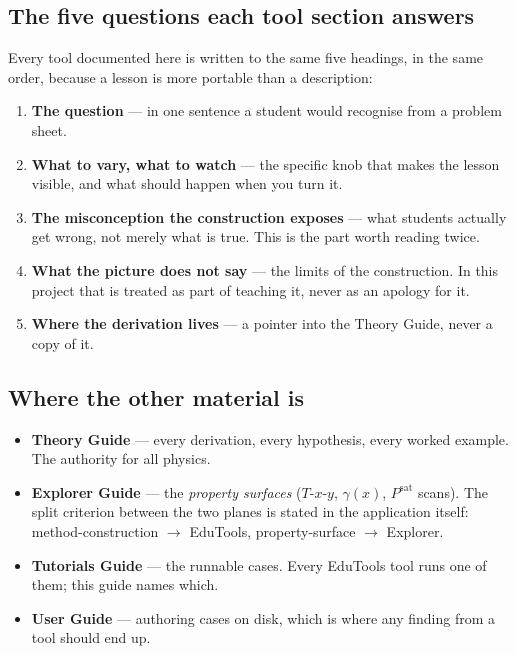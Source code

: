 \documentclass[11pt,a4paper]{article}
\begin{document}
\subsection*{The five questions each tool section answers}

Every tool documented here is written to the same five headings, in the
same order, because a lesson is more portable than a description:

\begin{enumerate}[leftmargin=*,nosep,topsep=2pt]
  \item \textbf{The question} --- in one sentence a student would recognise
        from a problem sheet.
  \item \textbf{What to vary, what to watch} --- the specific knob that
        makes the lesson visible, and what should happen when you turn it.
  \item \textbf{The misconception the construction exposes} --- what
        students actually get wrong, not merely what is true.  This is the
        part worth reading twice.
  \item \textbf{What the picture does not say} --- the limits of the
        construction.  In this project that is treated as part of teaching
        it, never as an apology for it.
  \item \textbf{Where the derivation lives} --- a pointer into the Theory
        Guide, never a copy of it.
\end{enumerate}

\subsection*{Where the other material is}

\begin{itemize}[leftmargin=*,nosep]
  \item \textbf{Theory Guide} --- every derivation, every hypothesis, every
        worked example.  The authority for all physics.
  \item \textbf{Explorer Guide} --- the \emph{property surfaces}
        ($T$-$x$-$y$, $\gamma(x)$, $P^{\mathrm{sat}}$ scans).  The split
        criterion between the two planes is stated in the application
        itself: method-construction $\rightarrow$ EduTools,
        property-surface $\rightarrow$ Explorer.
  \item \textbf{Tutorials Guide} --- the runnable cases.  Every EduTools
        tool runs one of them; this guide names which.
  \item \textbf{User Guide} --- authoring cases on disk, which is where any
        finding from a tool should end up.
\end{itemize}
\end{document}
